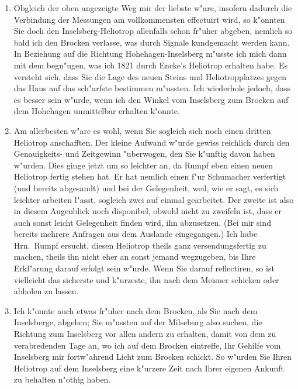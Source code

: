 \documentclass[12pt,a4paper]{article}
\theoremstyle{plain}
\theoremstyle{definition}
\theoremstyle{remark}
\begin{document}
\begin{enumerate}[label=\arabic*)]
In Beziehung auf diesen Plan wird also alles darauf ankommen, ob Sie die Verbindung mit dem Brocken und den hannoverschen Dreiecken f"ur wichtig genug halten, die Besetzung des Kn"ulls und der Milseburg mit Heliotropen so lange aufzuschieben, bis jener effectuirt ist.
\item Obgleich der oben angezeigte Weg mir der liebste w"are, insofern dadurch die Verbindung der Messungen am vollkommensten effectuirt wird, so k"onnten Sie doch den Inselsberg-Heliotrop allenfalls schon fr"uher abgeben, nemlich so bald ich den Brocken verlasse, was durch Signale kundgemacht werden kann. In Beziehung auf die Richtung Hohehagen-Inselsberg m"usste ich mich dann mit dem begn"ugen, was ich 1821 durch Encke's Heliotrop erhalten habe. Es versteht sich, dass Sie die Lage des neuen Steins und Heliotropplatzes gegen das Haus auf das sch"arfste bestimmen m"ussten. Ich wiederhole jedoch, dass es besser sein w"urde, wenn ich den Winkel vom Inselsberg zum Brocken auf dem Hohehagen unmittelbar erhalten k"onnte.
\item Am allerbesten w"are es wohl, wenn Sie sogleich sich noch einen dritten Heliotrop anschafften. Der kleine Aufwand w"urde gewiss reichlich durch den Genauigkeits- und Zeitgewinn "uberwogen, den Sie k"unftig davon haben w"urden. Dies ginge jetzt um so leichter an, da Rumpf eben einen neuen Heliotrop fertig stehen hat. Er hat nemlich einen f"ur Schumacher verfertigt (und bereits abgesandt) und bei der Gelegenheit, weil, wie er sagt, es sich leichter arbeiten l"asst, sogleich zwei auf einmal gearbeitet. Der zweite ist also in diesem Augenblick noch disponibel, obwohl nicht zu zweifeln ist, dass er auch sonst leicht Gelegenheit finden wird, ihn abzusetzen. (Bei mir sind bereits mehrere Anfragen aus dem Auslande eingegangen.) Ich habe Hrn.\ Rumpf ersucht, diesen Heliotrop theils ganz versendungsfertig zu machen, theils ihn nicht eher an sonst jemand wegzugeben, bis Ihre Erkl"arung darauf erfolgt sein w"urde. Wenn Sie darauf reflectiren, so ist vielleicht das sicherste und k"urzeste, ihn nach dem Meisner schicken oder abholen zu lassen.
\item Ich k"onnte auch etwas fr"uher nach dem Brocken, als Sie nach dem Inselsberge, abgehen; Sie m"ussten auf der Milseburg also suchen, die Richtung zum Inselsberg vor allen andern zu erhalten, damit von dem zu verabredenden Tage an, wo ich auf dem Brocken eintreffe, Ihr Gehilfe vom Inselsberg mir fortw"ahrend Licht zum Brocken schickt. So w"urden Sie Ihren Heliotrop auf dem Inselsberg eine k"urzere Zeit nach Ihrer eigenen Ankunft zu behalten n"othig haben.
\end{enumerate}
\end{document}
